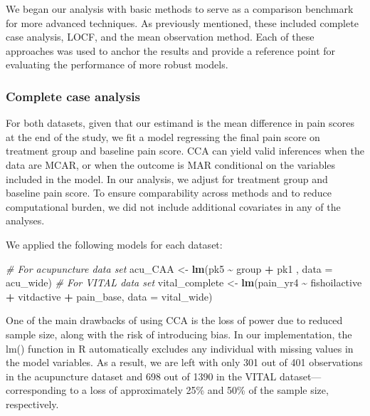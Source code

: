 \documentclass{article}
\newenvironment{Shaded}{\begin{snugshade}}{\end{snugshade}}
\newcommand{\AttributeTok}[1]{\textcolor[rgb]{0.13,0.29,0.53}{#1}}
\newcommand{\CommentTok}[1]{\textcolor[rgb]{0.56,0.35,0.01}{\textit{#1}}}
\newcommand{\FunctionTok}[1]{\textcolor[rgb]{0.13,0.29,0.53}{\textbf{#1}}}
\newcommand{\NormalTok}[1]{#1}
\newcommand{\OtherTok}[1]{\textcolor[rgb]{0.56,0.35,0.01}{#1}}
\newcommand{\SpecialCharTok}[1]{\textcolor[rgb]{0.81,0.36,0.00}{\textbf{#1}}}
\begin{document}
We began our analysis with basic methods to serve as a comparison
benchmark for more advanced techniques. As previously mentioned, these
included complete case analysis, LOCF, and the mean observation method.
Each of these approaches was used to anchor the results and provide a
reference point for evaluating the performance of more robust models.

\subsubsection{Complete case analysis}\label{complete-case-analysis}

For both datasets, given that our estimand is the mean difference in
pain scores at the end of the study, we fit a model regressing the final
pain score on treatment group and baseline pain score. CCA can yield
valid inferences when the data are MCAR, or when the outcome is MAR
conditional on the variables included in the model. In our analysis, we
adjust for treatment group and baseline pain score. To ensure
comparability across methods and to reduce computational burden, we did
not include additional covariates in any of the analyses.

We applied the following models for each dataset:

\begin{Shaded}
\begin{Highlighting}[]
\CommentTok{\# For acupuncture data set}
\NormalTok{acu\_CAA }\OtherTok{\textless{}{-}} \FunctionTok{lm}\NormalTok{(pk5 }\SpecialCharTok{\textasciitilde{}}\NormalTok{ group }\SpecialCharTok{+}\NormalTok{ pk1 , }\AttributeTok{data =}\NormalTok{ acu\_wide)}
\CommentTok{\# For VITAL data set}
\NormalTok{vital\_complete }\OtherTok{\textless{}{-}} \FunctionTok{lm}\NormalTok{(pain\_yr4 }\SpecialCharTok{\textasciitilde{}}\NormalTok{ fishoilactive }\SpecialCharTok{+}\NormalTok{ vitdactive }\SpecialCharTok{+}\NormalTok{ pain\_base, }\AttributeTok{data =}\NormalTok{ vital\_wide)}
\end{Highlighting}
\end{Shaded}

One of the main drawbacks of using CCA is the loss of power due to
reduced sample size, along with the risk of introducing bias. In our
implementation, the lm() function in R automatically excludes any
individual with missing values in the model variables. As a result, we
are left with only 301 out of 401 observations in the acupuncture
dataset and 698 out of 1390 in the VITAL dataset---corresponding to a
loss of approximately 25\% and 50\% of the sample size, respectively.
\end{document}
